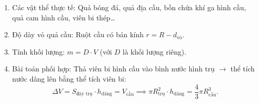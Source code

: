 \begin{enumerate}
\item Các vật thể thực tế: Quả bóng đá, quả địa cầu, bồn chứa khí ga hình cầu, quả cam hình cầu, viên bi thép\dots
\item Độ dày vỏ quả cầu: Ruột cầu có bán kính $r = R - d_{\text{vỏ}}$.
\item Tính khối lượng: $m = D \cdot V$ (với $D$ là khối lượng riêng).
\item Bài toán phối hợp: Thả viên bi hình cầu vào bình nước hình trụ $\rightarrow$ thể tích nước dâng lên bằng thể tích viên bi:
$$\Delta V = S_{\text{đáy trụ}} \cdot h_{\text{dâng}} = V_{\text{cầu}} \implies \pi R_{\text{trụ}}^2 \cdot h_{\text{dâng}} = \dfrac{4}{3}\pi R_{\text{cầu}}^3.$$
\end{enumerate}
